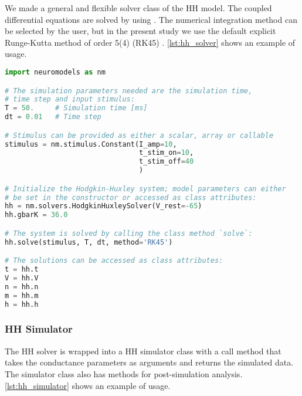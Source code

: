 We made a general and flexible solver class of the HH model. The coupled differential equations are solved by using . The numerical integration method can be selected by the user, but in the present study we use the default explicit Runge-Kutta method of order 5(4) (RK45) \cite{RK45}. \cref{lst:hh_solver} shows an example of usage.


\begin{lstlisting}[language=python, label={lst:hh_solver}, caption={Example usage of the HH solver.}]
import neuromodels as nm

# The simulation parameters needed are the simulation time,
# time step and input stimulus:
T = 50.     # Simulation time [ms]
dt = 0.01   # Time step 

# Stimulus can be provided as either a scalar, array or callable
stimulus = nm.stimulus.Constant(I_amp=10,
                                t_stim_on=10,
                                t_stim_off=40
                                )

# Initialize the Hodgkin-Huxley system; model parameters can either
# be set in the constructor or accessed as class attributes:
hh = nm.solvers.HodgkinHuxleySolver(V_rest=-65)
hh.gbarK = 36.0

# The system is solved by calling the class method `solve`:
hh.solve(stimulus, T, dt, method='RK45')

# The solutions can be accessed as class attributes:
t = hh.t
V = hh.V
n = hh.n
m = hh.m
h = hh.h
\end{lstlisting}

\subsubsection*{HH Simulator}

The HH solver is wrapped into a HH simulator class with a call method that takes the conductance parameters as arguments and returns the simulated data. The simulator class also has methods for post-simulation analysis. \cref{lst:hh_simulator} shows an example of usage.


